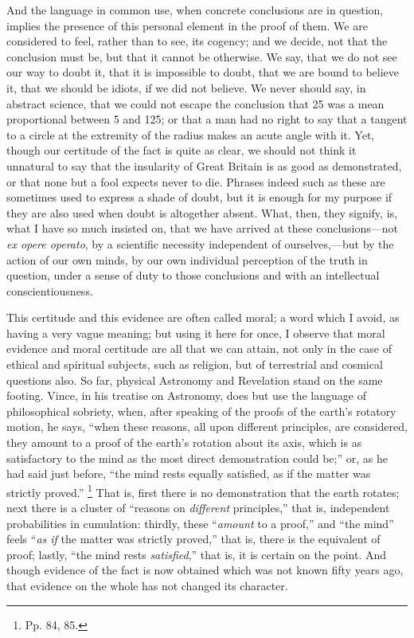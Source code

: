 And the language in common use, when concrete conclusions are in
question, implies the presence of this personal element in the proof
of them. We are considered to feel, rather than to see, its cogency;
and we decide, not that the conclusion must be, but that it cannot be
otherwise. We say, that we do not see our way to doubt it, that it is
impossible to doubt, that we are bound to believe it, that we should
be idiots, if we did not believe. We never should say, in abstract
science, that we could not escape the conclusion that 25 was a
mean proportional between 5 and 125; or that a man had no right to say
that a tangent to a circle at the extremity of the radius makes an
acute angle with it. Yet, though our certitude of the fact is quite as
clear, we should not think it unnatural to say that the insularity of
Great Britain is as good as demonstrated, or that none but a fool
expects never to die. Phrases indeed such as these are sometimes used
to express a shade of doubt, but it is enough for my purpose if they
are also used when doubt is altogether absent. What, then, they
signify, is, what I have so much insisted on, that we have arrived at
these conclusions—not \emph{ex opere operato}, by a scientific
necessity independent of ourselves,—but by the action of our own
minds, by our own individual perception of the truth in question,
under a sense of duty to those conclusions and with an intellectual
conscientiousness.

This certitude and this evidence are often called moral; a word
which I avoid, as having a very vague meaning; but using it here for
once, I observe that moral evidence and moral certitude are all that
we can attain, not only in the case of ethical and spiritual subjects,
such as religion, but of terrestrial and cosmical questions also. So
far, physical Astronomy and Revelation stand on the same footing.
Vince, in his treatise on Astronomy, does but use the language of
philosophical sobriety, when, after speaking of the proofs of the
earth's rotatory motion, he says, ``when these reasons, all upon
different principles, are considered, they amount to a proof of the
earth's rotation about its axis, which is as satisfactory to the mind as the most direct demonstration could be;'' or, as he had
said just before, ``the mind rests equally satisfied, as if the
matter was strictly proved.'' \footnote{Pp. 84, 85.} That is, first there is no demonstration that the earth
rotates; next there is a cluster of ``reasons on \emph{different}
principles,'' that is, independent probabilities in cumulation:
thirdly, these ``\emph{amount} to a proof,'' and ``the
mind'' feels ``\emph{as if} the matter was strictly
proved,'' that is, there is the equivalent of proof; lastly,
``the mind rests \emph{satisfied},'' that is, it is certain on
the point. And though evidence of the fact is now obtained which was
not known fifty years ago, that evidence on the whole has not changed
its character.

